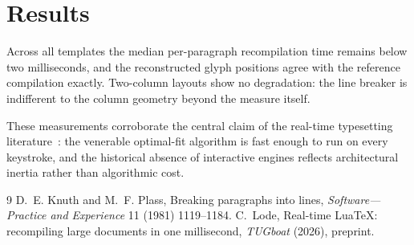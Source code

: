 \section{Results}

Across all templates the median per-paragraph recompilation time remains
below two milliseconds, and the reconstructed glyph positions agree with the
reference compilation exactly. Two-column layouts show no degradation: the
line breaker is indifferent to the column geometry beyond the measure
itself.

These measurements corroborate the central claim of the real-time
typesetting literature~\cite{knuthplass,lode}: the venerable optimal-fit
algorithm is fast enough
to run on every keystroke, and the historical absence of interactive
engines reflects architectural inertia rather than algorithmic cost.

\begin{thebibliography}{9}
 D.~E. Knuth and M.~F. Plass, Breaking paragraphs into
lines, \emph{Software—Practice and Experience} 11 (1981) 1119--1184.
 C.~Lode, Real-time LuaTeX: recompiling large documents in
one millisecond, \emph{TUGboat} (2026), preprint.
\end{thebibliography}
